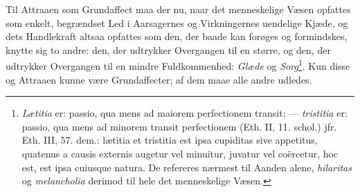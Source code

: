 \documentclass[12pt,a4paper]{book}
\begin{document}
Til Attraaen som Grundaffect maa der nu, naar det
menneskelige Væsen opfattes som enkelt, begrændset Led
i Aarsagernes og Virkningernes uendelige Kjæde, og dets
Handlekraft altsaa opfattes som den, der baade kan forøges
og formindskes, knytte sig to andre: den, der udtrykker
Overgangen til en større, og den, der udtrykker Overgangen
til en mindre Fuldkommenhed: \emph{Glæde} og \emph{Sorg}\footnote{\emph{Lætitia}
er: passio, qua mens ad maiorem perfectionem transit;
--- \emph{tristitia} er: passio, qua mens ad minorem transit
perfectionem (Eth. II, 11. schol.) jfr. Eth. III, 57. dem.:
lætitia et tristitia est ipsa cupiditas sive appetitus, quatenus
a causis externis augetur vel minuitur, juvatur vel coërcetur,
hoc est, est ipsa cuiusque natura. De refereres nærmest til
Aanden alene, \emph{hilaritas} og \emph{melancholia} derimod til hele
det menneskelige Væsen.}. Kun
disse og Attraaen kunne være Grundaffecter; af dem maae
alle andre udledes.
\end{document}
